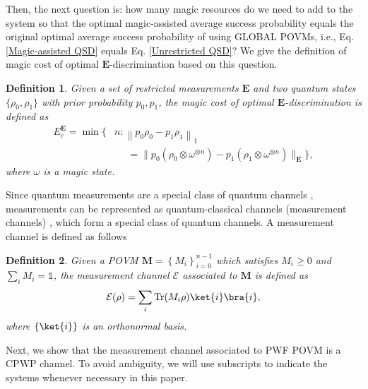 \documentclass[aps,pra,twocolumn,floatfix,amsfonts,10pt]{revtex4-2}
\newtheorem{definition}{Definition}
\begin{document}
Then, the next question is: how many magic resources do we need to add to the system so that the optimal magic-assisted average success probability equals the original optimal average success probability of using GLOBAL POVMs, i.e., Eq. \eqref{Magic-assisted QSD} equals Eq. \eqref{Unrestricted QSD}?
We give the definition of magic cost of optimal $\mathbf{E}$-discrimination based on this question.
\begin{definition}
	Given a set of restricted measurements $\mathbf{E}$ and two quantum states $\{\rho_0,\rho_1\}$ with prior probability $p_0,p_1$, the magic cost of optimal $\mathbf{E}$-discrimination is defined as
	\begin{equation}
		\begin{aligned}
			E_c^{\mathbf{E}} = \min \biggl\{ &n:\left\|p_0\rho_0 - p_1\rho_1 \right\|_1  \\ &~~~~~~= \|p_0(\rho_0 \otimes \omega^{\otimes n})-p_1(\rho_1 \otimes \omega^{\otimes n}) \|_{\mathbf{E}} \biggr\},
		\end{aligned}
	\end{equation}
	where $\omega$ is a magic state.
\end{definition}

Since quantum measurements are a special class of quantum channels \cite{NC2011}, measurements can be represented as quantum-classical channels (measurement channels) \cite{H1998,P2009}, which form a special class of quantum channels. 
A measurement channel is defined as follows
\begin{definition}
	Given a POVM $\mathbf{M}=\left\{M_i\right\}_{i=0}^{n-1}$ which satisfies $M_i \geqslant 0$ and $\sum_{i}M_i = \mathds{1}$, the measurement channel $\mathcal{E}$ associated to $\mathbf{M}$ is defined as
	\begin{equation}
		\mathcal{E}(\rho) = \displaystyle\sum_{i} \mathrm{Tr}(M_i \rho) \ket{i} \bra{i},
	\end{equation}
	where $\{\ket{i}\}$ is an orthonormal basis.
\end{definition} 

Next, we show that the measurement channel associated to PWF POVM is a CPWP channel.
To avoid ambiguity, we will use subscripts to indicate the systems whenever necessary in this paper.
\end{document}
